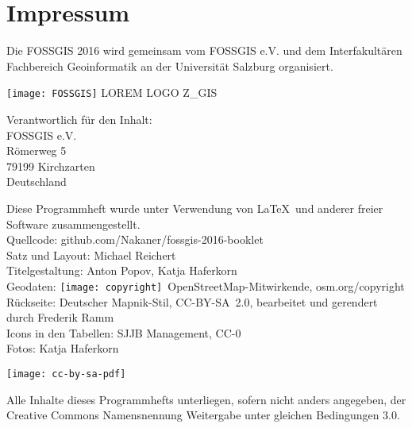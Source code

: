 \newpage
\section*{Impressum}
\label{impressum}


\RaggedRight
Die FOSSGIS 2016 wird gemeinsam vom FOSSGIS e.V. und dem Interfakultären Fachbereich Geoinformatik an der Universität Salzburg organisiert.

\vspace{0.5em}
	\texttt{[image: FOSSGIS]}
	\hfill
	LOREM LOGO Z\_GIS

\vspace{0.5em}
\noindent Verantwortlich für den Inhalt:\\
FOSSGIS e.V.\\
Römerweg 5\\
79199 Kirchzarten\\
Deutschland

\vspace{0.5em}
{\small\noindent Diese Programmheft wurde unter Verwendung von \LaTeX\ und 
anderer freier Software zusammengestellt.\\
 Quellcode: github.com/Nakaner/fossgis-2016-booklet\\
\noindent Satz und Layout: Michael Reichert\\
Titelgestaltung: Anton Popov, Katja Haferkorn\\
Geodaten: \texttt{[image: copyright]}~Open\-Street\-Map-Mitwirkende, osm.org/copyright\\
Rückseite: Deutscher Mapnik-Stil, CC-BY-SA~2.0, bearbeitet und gerendert durch Frederik Ramm\\
Icons in den Tabellen: SJJB Management, CC-0\\
Fotos: Katja Haferkorn\\
}

\vspace{1em}
\noindent \begin{minipage}[htbp]{0.2\textwidth}
\noindent\texttt{[image: cc-by-sa-pdf]}
\end{minipage}
\hfill
\begin{minipage}[hbtp]{0.74\textwidth}\RaggedRight
Alle Inhalte dieses Programmhefts unterliegen, sofern nicht anders angegeben, 
der Creative Commons Namensnennung Weitergabe unter gleichen Bedingungen 3.0.
\end{minipage}


